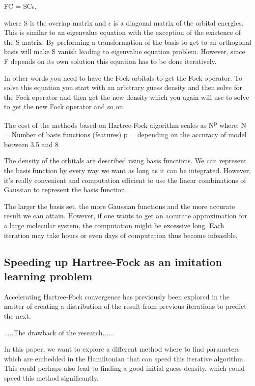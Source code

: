 \documentclass[twoside]{article}
\begin{document}
FC = SC$\epsilon$,

where S is the overlap matrix and $\epsilon$ is a diagonal matrix of the orbital energies. This is similar to an eigenvalue equation with the exception of the existence of the S matrix. By preforming a transformation of the basis to get to an orthogonal basis will make S vanish leading to eigenvalue equation problem. However, since F depends on its own solution this equation has to be done iteratively. 

In other words you need to have the Fock-orbitals to get the Fock operator. To solve this equation you start with an arbitrary guess density and then solve for the Fock operator and then get the new density which you again will use to solve to get the new Fock operator and so on. 

The cost of the methods based on Hartree-Fock algorithm scales as N\textsuperscript{p} where: 
N = Number of basis functions (features) 
p  = depending on the accuracy of model between 3.5 and 8\cite{frisch1996exploring}

The density of the orbitals are described using basis functions. We can represent the basis function by every way we want as long as it can be integrated. However, it's really convenient and computation efficient to use the linear combinations of Gaussian to represent the basis function.

The larger the basis set, the more Gaussian functions and the more accurate result we can attain. However, if one wants to get an accurate approximation for a large molecular system, the computation might be excessive long. Each iteration may take hours or even days of computation thus become infeasible. 




\subsection{Speeding up Hartree-Fock as an imitation learning problem}


Accelerating Hartree-Fock convergence has previously been explored in the matter of creating a distribution of the result from previous iterations to predict the next\cite{Pulay1980}. 

.....The drawback of the research......

In this paper,
we want to explore a different method where to find parameters which are embedded in the Hamiltonian that can speed this iterative algorithm. This could perhaps also lead to finding a good initial guess density, which could speed this method significantly. 
\end{document}
